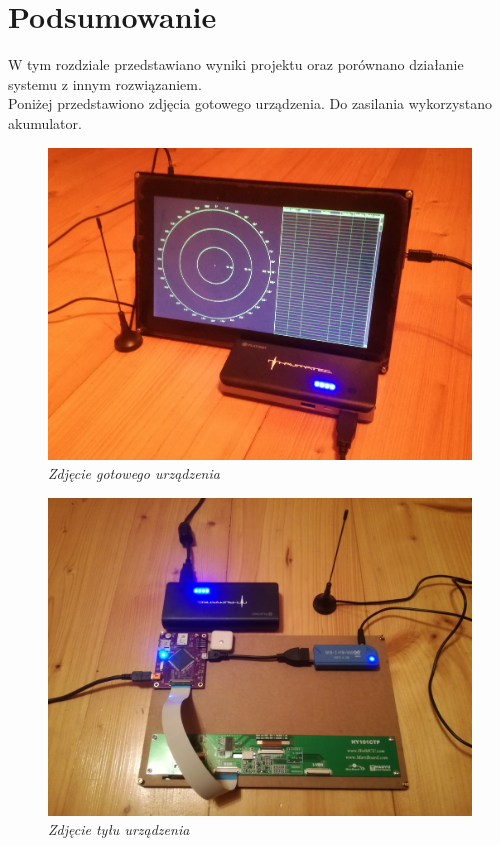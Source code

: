 \documentclass[eng,printmode]{mgr}
\begin{document}
\chapter{ Podsumowanie }
W tym rozdziale przedstawiano wyniki projektu oraz porównano działanie systemu z innym rozwiązaniem.
\\


Poniżej przedstawiono zdjęcia gotowego urządzenia. Do zasilania wykorzystano akumulator.

\vskip 1cm
\begin{figure}[!h]
    \centering
    \includegraphics[width=\textwidth]{images/deviceTop2}
    \caption{\textit{Zdjęcie gotowego urządzenia}}
\end{figure}
\newpage
\begin{figure}[!h]
    \centering
    \includegraphics[width=\textwidth]{images/deviceBottom}
    \caption{\textit{Zdjęcie tyłu urządzenia}}
\end{figure}
\end{document}
